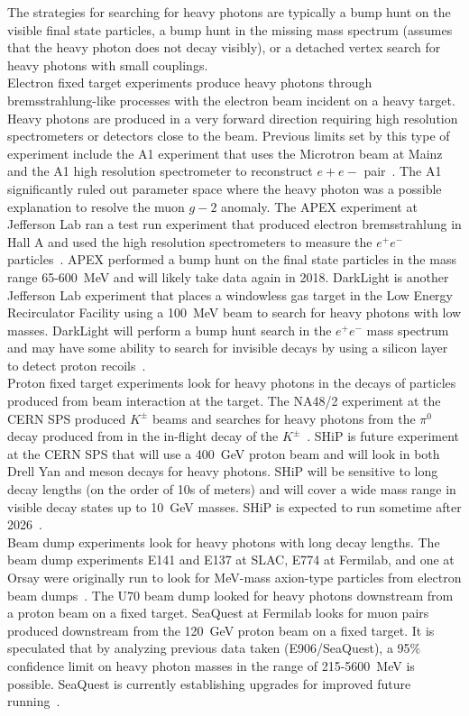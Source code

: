 The strategies for searching for heavy photons are typically a bump hunt on the visible final state particles, a bump hunt in the missing mass spectrum (assumes that the heavy photon does not decay visibly), or a detached vertex search for heavy photons with small couplings. \\
\indent Electron fixed target experiments produce heavy photons through bremsstrahlung-like processes with the electron beam incident on a heavy target. Heavy photons are produced in a very forward direction requiring high resolution spectrometers or detectors close to the beam. Previous limits set by this type of experiment include the A1 experiment that uses the Microtron beam at Mainz and the A1 high resolution spectrometer to reconstruct $e+e-$ pair~\cite{beranek_theoretical_2013}. The A1 significantly ruled out parameter space where the heavy photon was a possible explanation to resolve the muon $g-2$ anomaly. The APEX experiment at Jefferson Lab ran a test run experiment that produced electron bremsstrahlung in Hall A and used the high resolution spectrometers to measure the $e^+e^-$ particles~\cite{abrahamyan_search_2011}. APEX performed a bump hunt on the final state particles in the mass range 65-600~MeV and will likely take data again in 2018. DarkLight is another Jefferson Lab experiment that places a windowless gas target in the Low Energy Recirculator Facility using a 100~MeV beam to search for heavy photons with low masses. DarkLight will perform a bump hunt search in the $e^+e^-$ mass spectrum and may have some ability to search for invisible decays by using a silicon layer to detect proton recoils~\cite{alewski_darklight_2014}.\\
\indent Proton fixed target experiments look for heavy photons in the decays of particles produced from beam interaction at the target. The NA48/2 experiment at the CERN SPS produced $K^{\pm}$ beams and searches for heavy photons from the $\pi^0$ decay produced from in the in-flight decay of the $K^{\pm}$~\cite{Batley_2015lha}. SHiP is future experiment at the CERN SPS that will use a 400~GeV proton beam and will look in both Drell Yan and meson decays for heavy photons. SHiP will be sensitive to long decay lengths (on the order of 10s of meters) and will cover a wide mass range in visible decay states up to 10~GeV masses. SHiP is expected to run sometime after 2026~\cite{ship_collaboration_facility_2015}.\\
\indent Beam dump experiments look for heavy photons with long decay lengths. The beam dump experiments E141 and E137 at SLAC, E774 at Fermilab, and one at Orsay were originally run to look for MeV-mass axion-type particles from electron beam dumps~\cite{alexander_dark_2016}. The U70 beam dump looked for heavy photons downstream from a proton beam on a fixed target. SeaQuest at Fermilab looks for muon pairs produced downstream from the 120~GeV proton beam on a fixed target. It is speculated that by analyzing previous data taken (E906/SeaQuest), a 95$\%$ confidence limit on heavy photon masses in the range of 215-5600~MeV is possible. SeaQuest is currently establishing upgrades for improved future running~\cite{gardner_new_2016}.
